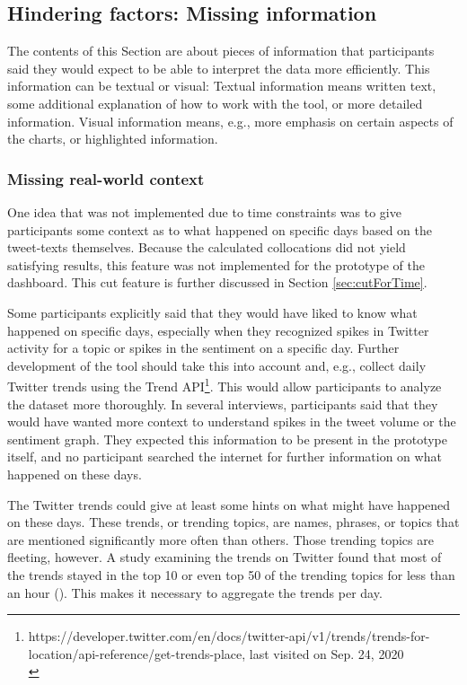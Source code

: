 \subsection{Hindering factors: Missing information}
The contents of this Section are about pieces of information that participants said they would expect to be able to interpret the data more efficiently. This information can be textual or visual: Textual information means written text, some additional explanation of how to work with the tool, or more detailed information. Visual information means, e.g., more emphasis on certain aspects of the charts, or highlighted information.

\subsubsection*{Missing real-world context}
One idea that was not implemented due to time constraints was to give participants some context as to what happened on specific days based on the tweet-texts themselves. Because the calculated collocations did not yield satisfying results, this feature was not implemented for the prototype of the dashboard. This cut feature is further discussed in Section \ref{sec:cutForTime}.

Some participants explicitly said that they would have liked to know what happened on specific days, especially when they recognized spikes in Twitter activity for a topic or spikes in the sentiment on a specific day. Further development of the tool should take this into account and, e.g., collect daily Twitter trends using the Trend API\footnote{https://developer.twitter.com/en/docs/twitter-api/v1/trends/trends-for-location/api-reference/get-trends-place, last visited on Sep. 24, 2020 \\}. This would allow participants to analyze the dataset more thoroughly. In several interviews, participants said that they would have wanted more context to understand spikes in the tweet volume or the sentiment graph. They expected this information to be present in the prototype itself, and no participant searched the internet for further information on what happened on these days.

The Twitter trends could give at least some hints on what might have happened on these days. These trends, or trending topics, are names, phrases, or topics that are mentioned significantly more often than others. Those trending topics are fleeting, however. A study examining the trends on Twitter found that most of the trends stayed in the top 10 or even top 50 of the trending topics for less than an hour (\cite{annamoradnejadComprehensiveAnalysisTwitter2019}). This makes it necessary to aggregate the trends per day.

